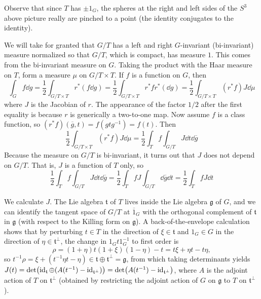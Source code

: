 \documentclass[../../rtnotes.tex]{subfiles}
\begin{document}
Observe that since $T$ has $\pm 1_G$, the spheres at the right and left sides of the $S^3$ above picture really are pinched to a point (the identity conjugates to the identity).

We will take for granted that $G/T$ has a left and right $G$-invariant (bi-invariant) measure normalized so that $G/T$, which is compact, has measure $1$. This comes from the bi-invariant measure on $G$. Taking the product with the Haar measure on $T$, form a measure $\mu$ on $G/T\times T$. If $f$ is a function on $G$, then 
\[\int_G f\dd g = \frac{1}{2}\int_{G/T\times T}r^\ast(f\dd g) = \frac{1}{2}\int_{G/T\times T}r^\ast fr^\ast(\dd g) = \frac{1}{2}\int_{G/T\times T}(r^\ast f)J\dd \mu\]
where $J$ is the Jacobian of $r$. The appearance of the factor $1/2$ after the first equality is because $r$ is generically a two-to-one map. Now assume $f$ is a class function, so $(r^\ast f)(\overline{g},t) = f(gtg^{-1}) = f(t)$. Then 
\[\frac{1}{2}\int_{G/T\times T}(r^\ast f)J\dd \mu = \frac{1}{2}\int_Tf\int_{G/T}J\dd t\dd \overline g\]
Because the measure on $G/T$ is bi-invariant, it turns out that $J$ does not depend on $G/T$. That is, $J$ is a function of $T$ only, so
\[\frac{1}{2}\int_Tf\int_{G/T}J\dd t\dd \overline g = \frac{1}{2}\int_TfJ\int_{G/T}\dd \overline g\dd t = \frac{1}{2}\int_T fJ\dd t\]

We calculate $J$. The Lie algebra $\mathfrak t$ of $T$ lives inside the Lie algebra $\mathfrak g$ of $G$, and we can identify the tangent space of $G/T$ at $\overline 1_G$ with the orthogonal complement of $\mathfrak t$ in $\mathfrak g$ (with respect to the Killing form on $\mathfrak g$). A back-of-the-envelope calculation shows that by perturbing $t\in T$ in the direction of $\xi\in \mathfrak t$ and $1_G\in G$ in the direction of $\eta\in \mathfrak t^\perp$, the change in $1_Gt1_G^{-1}$ to first order is 
\[\rho = (1+\eta)t(1+\xi)(1-\eta) - t = t\xi + \eta t - t\eta,\]
so $t^{-1}\rho = \xi + (t^{-1}\eta t-\eta)\in \mathfrak t \oplus \mathfrak t^\perp =\mathfrak g$, from which taking determinants yields $J(t) = \det(\operatorname{id}_{\mathfrak t}\oplus (A(t^{-1})-\operatorname{id}_{\mathfrak t^\perp})) = \det(A(t^{-1})-\operatorname{id}_{\mathfrak t^\perp})$, where $A$ is the adjoint action of $T$ on $\mathfrak t^\perp$ (obtained by restricting the adjoint action of $G$ on $\mathfrak g$ to $T$ on $\mathfrak t^\perp$).
\end{document}

